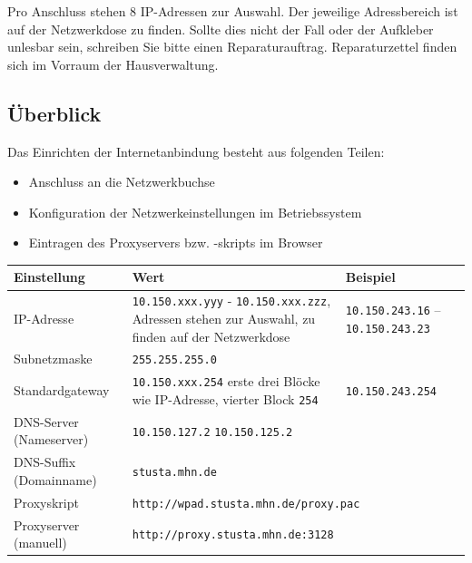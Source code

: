 \documentclass[a4paper,12pt]{scrartcl}
\begin{document}
Pro Anschluss stehen 8 IP-Adressen zur Auswahl. Der jeweilige Adressbereich ist auf der Netzwerkdose zu finden. Sollte dies nicht der Fall oder der Aufkleber unlesbar sein, schreiben Sie bitte einen Reparaturauftrag. Reparaturzettel finden sich im Vorraum der Hausverwaltung.

\subsection*{Überblick}

Das Einrichten der Internetanbindung besteht aus folgenden Teilen:
\begin{itemize}
    \item Anschluss an die Netzwerkbuchse
    \item Konfiguration der Netzwerkeinstellungen im Betriebssystem
    \item Eintragen des Proxyservers bzw. -skripts im Browser
\end{itemize}


\begin{center}
  \begin{tabularx}{\linewidth}{|lXp{.2\linewidth}|}
    \hline
    Einstellung & Wert & Beispiel \\
    \hline \hline
    IP-Adresse & \nolinkurl{10.150.xxx.yyy} - \nolinkurl{10.150.xxx.zzz}, \newline 8 Adressen stehen zur Auswahl, zu finden auf der Netzwerkdose & \nolinkurl{10.150.243.16} – \nolinkurl{10.150.243.23} \\
    \hline
    Subnetzmaske & \nolinkurl{255.255.255.0} & \\
    \hline
    Standardgateway & \nolinkurl{10.150.xxx.254} \newline erste drei Blöcke wie IP-Adresse, vierter Block \nolinkurl{254} & \nolinkurl{10.150.243.254} \\
    \hline
    DNS-Server (Nameserver) & \nolinkurl{10.150.127.2} \newline \nolinkurl{10.150.125.2} & \\
    \hline
    DNS-Suffix (Domainname) & \nolinkurl{stusta.mhn.de} & \\
    \hline
    Proxyskript & \multicolumn{2}{l|}{\nolinkurl{http://wpad.stusta.mhn.de/proxy.pac}} \\
    \hline
    Proxyserver (manuell) & \multicolumn{2}{l|}{\nolinkurl{http://proxy.stusta.mhn.de:3128}} \\
    \hline
  \end{tabularx}
\end{center}
\end{document}
